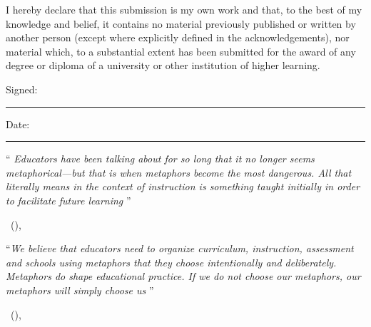 \documentclass[
12pt, %
oneside, %
english, %
onehalfspacing,
headsepline, %
]{MastersDoctoralThesis} %
\newcommand\mycite[2][]{\citeauthor{#2}\ (\citeyear{#2})\ifx#1\undefined\else, #1\fi}
\begin{document}





\begin{declaration}
\addchaptertocentry{\authorshipname}

\noindent
I hereby declare that this submission is my own work and that, to the
best of my knowledge and belief, it contains no material previously
published or written by another person (except where explicitly
defined in the acknowledgements), nor material which, to a substantial
extent has been submitted for the award of any degree or diploma of a
university or other institution of higher learning.

\rule{0mm}{20mm}

\noindent Signed:\\
\rule[0.5em]{25em}{0.5pt} %
 
\noindent Date:\\
\rule[0.5em]{25em}{0.5pt} %
\end{declaration}

\cleardoublepage







\vspace*{0.2\textheight}


\noindent\begin{singlespace}\enquote{\itshape
Educators have been talking about  for so long
that it no longer seems metaphorical---but that is when metaphors
become the most dangerous.  All that  literally
means in the context of instruction is something taught initially in
order to facilitate future learning
}\bigbreak\end{singlespace}
\hfill\mycite{bereiter2005}

\rule{0mm}{30mm}
\noindent\begin{singlespace}\enquote{\itshape We believe that
  educators need to organize curriculum, instruction, assessment and
  schools using metaphors that they choose intentionally and
  deliberately.  Metaphors do shape educational practice.  If we do
  not choose our metaphors, our metaphors will simply choose
  us
}\bigbreak\end{singlespace}
\hfill\mycite{badley2012} %
\end{document}
